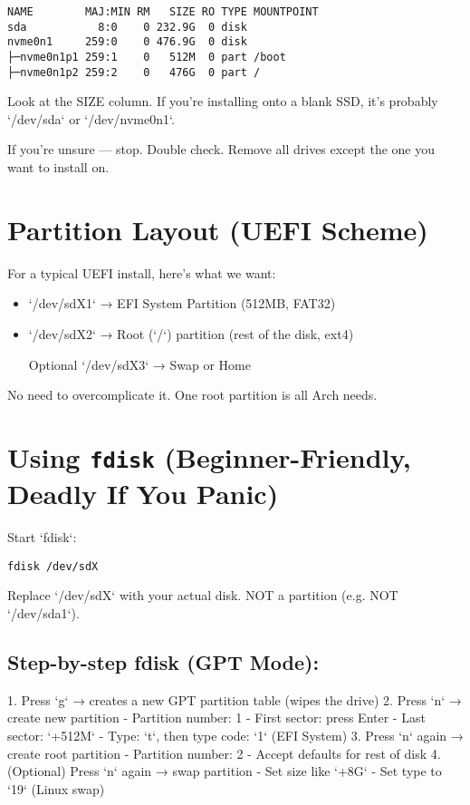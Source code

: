 \documentclass[12pt]{book}
\begin{document}
\begin{lstlisting}
NAME        MAJ:MIN RM   SIZE RO TYPE MOUNTPOINT
sda           8:0    0 232.9G  0 disk
nvme0n1     259:0    0 476.9G  0 disk
├─nvme0n1p1 259:1    0   512M  0 part /boot
├─nvme0n1p2 259:2    0   476G  0 part /
\end{lstlisting}

Look at the SIZE column. If you're installing onto a blank SSD, it's probably `/dev/sda` or `/dev/nvme0n1`.

If you’re unsure — stop. Double check. Remove all drives except the one you want to install on.

\section{Partition Layout (UEFI Scheme)}

For a typical UEFI install, here’s what we want:

\begin{itemize}
  \item `/dev/sdX1` → EFI System Partition (512MB, FAT32)
  \item `/dev/sdX2` → Root (`/`) partition (rest of the disk, ext4)
  \item [Optional] `/dev/sdX3` → Swap or Home
\end{itemize}

No need to overcomplicate it. One root partition is all Arch needs.

\section{Using \texttt{fdisk} (Beginner-Friendly, Deadly If You Panic)}

Start `fdisk`:

\begin{lstlisting}
fdisk /dev/sdX
\end{lstlisting}

Replace `/dev/sdX` with your actual disk. NOT a partition (e.g. NOT `/dev/sda1`).

\subsection*{Step-by-step fdisk (GPT Mode):}

1. Press `g` → creates a new GPT partition table (wipes the drive)
2. Press `n` → create new partition
   - Partition number: 1
   - First sector: press Enter
   - Last sector: `+512M`
   - Type: `t`, then type code: `1` (EFI System)
3. Press `n` again → create root partition
   - Partition number: 2
   - Accept defaults for rest of disk
4. (Optional) Press `n` again → swap partition
   - Set size like `+8G`
   - Set type to `19` (Linux swap)
\end{document}
